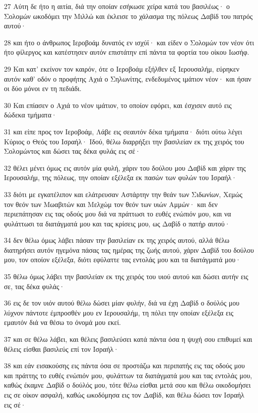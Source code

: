 \par 27 Αύτη δε ήτο η αιτία, διά την οποίαν εσήκωσε χείρα κατά του βασιλέως· ο Σολομών ωκοδόμει την Μιλλώ και έκλεισε το χάλασμα της πόλεως Δαβίδ του πατρός αυτού·
\par 28 και ήτο ο άνθρωπος Ιεροβοάμ δυνατός εν ισχύϊ· και είδεν ο Σολομών τον νέον ότι ήτο φίλεργος και κατέστησεν αυτόν επιστάτην επί πάντα τα φορτία του οίκου Ιωσήφ.
\par 29 Και κατ' εκείνον τον καιρόν, ότε ο Ιεροβοάμ εξήλθεν εξ Ιερουσαλήμ, εύρηκεν αυτόν καθ' οδόν ο προφήτης Αχιά ο Σηλωνίτης, ενδεδυμένος ιμάτιον νέον· και ήσαν οι δύο μόνοι εν τη πεδιάδι.
\par 30 Και επίασεν ο Αχιά το νέον ιμάτιον, το οποίον εφόρει, και έσχισεν αυτό εις δώδεκα τμήματα·
\par 31 και είπε προς τον Ιεροβοάμ, Λάβε εις σεαυτόν δέκα τμήματα· διότι ούτω λέγει Κύριος ο Θεός του Ισραήλ· Ιδού, θέλω διαρρήξει την βασιλείαν εκ της χειρός του Σολομώντος και δώσει τας δέκα φυλάς εις σέ·
\par 32 θέλει μένει όμως εις αυτόν μία φυλή, χάριν του δούλου μου Δαβίδ και χάριν της Ιερουσαλήμ, της πόλεως, την οποίαν εξέλεξα εκ πασών των φυλών του Ισραήλ·
\par 33 διότι με εγκατέλιπον και ελάτρευσαν Αστάρτην την θεάν των Σιδωνίων, Χεμώς τον θεόν των Μωαβιτών και Μελχώμ τον θεόν των υιών Αμμών· και δεν περιεπάτησαν εις τας οδούς μου διά να πράττωσι το ευθές ενώπιόν μου, και να φυλάττωσι τα διατάγματά μου και τας κρίσεις μου, ως Δαβίδ ο πατήρ αυτού·
\par 34 δεν θέλω όμως λάβει πάσαν την βασιλείαν εκ της χειρός αυτού, αλλά θέλω διατηρήσει αυτόν ηγεμόνα πάσας τας ημέρας της ζωής αυτού, χάριν Δαβίδ του δούλου μου, τον οποίον εξέλεξα, διότι εφύλαττε τας εντολάς μου και τα διατάγματά μου·
\par 35 θέλω όμως λάβει την βασιλείαν εκ της χειρός του υιού αυτού και δώσει αυτήν εις σε, τας δέκα φυλάς·
\par 36 εις δε τον υιόν αυτού θέλω δώσει μίαν φυλήν, διά να έχη Δαβίδ ο δούλός μου λύχνον πάντοτε έμπροσθέν μου εν Ιερουσαλήμ, τη πόλει την οποίαν εξέλεξα εις εμαυτόν διά να θέσω το όνομά μου εκεί.
\par 37 και σε θέλω λάβει, και θέλεις βασιλεύσει κατά πάντα όσα η ψυχή σου επιθυμεί και θέλεις είσθαι βασιλεύς επί τον Ισραήλ·
\par 38 και εάν εισακούσης εις πάντα όσα σε προστάζω και περιπατής εις τας οδούς μου και πράττης το ευθές ενώπιόν μου, φυλάττων τα διατάγματά μου και τας εντολάς μου, καθώς έκαμνε Δαβίδ ο δούλός μου, τότε θέλω είσθαι μετά σου και θέλω οικοδομήσει εις σε οίκον ασφαλή, καθώς ωκοδόμησα εις τον Δαβίδ, και θέλω δώσει τον Ισραήλ εις σέ·

